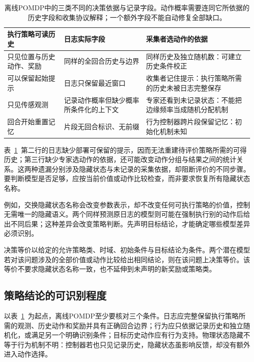 \begin{table}[htbp]
  \centering
  \small
  \begin{tabularx}{\linewidth}{XXX}
    \toprule
    执行策略可读历史 & 日志实际字段 & 采集者选动作的依据 \\
    \midrule
    只见位置与历史动作、奖励 & 同样的全回合历史与边界 & 同样历史及独立随机数：可建立历史条件校正 \\
    可以保留起始提示 & 日志只保留最近窗口 & 收集者记住提示：执行策略所需的历史未被日志完整保存 \\
    只见传感观测 & 记录动作概率但缺少概率所条件化的上下文 & 专家还看到未记录状态：不能把边缘频率当成随机分配机制 \\
    回合开始重置记忆 & 片段无回合标识、无前缀 & 行为控制器跨片段保留记忆：初始化机制未知 \\
    \bottomrule
  \end{tabularx}
  \caption{离线POMDP中的三类不同的决策依据与记录字段。动作概率需要连同它所依据的历史字段和收集协议解释；一个额外字段不能自动修复全部缺口。}
  \label{tab:rl-information-information-sets}
\end{table}

表~\ref{tab:rl-information-information-sets}~第二行的日志缺少部署可保留的提示，因而无法重建待评价策略所需的可得历史；第三行缺少专家选动作的依据，还可能改变动作分组与结果之间的统计关系。这两种遗漏分别涉及隐藏状态与未记录的采集依据，却阻断评价的不同步骤。要判断模型是否足够，应按当前价值或动作比较检查，而非要求恢复所有隐藏状态名称。

例如，交换隐藏状态名称会改变参数表示，却不改变任何可执行策略的价值，控制无需唯一的隐藏语义。两个同样预测原日志的模型则可能在强制执行别的动作后给出不同后果；这种差异会改变策略判断。先声明目标结论，才能确定哪些模型差异必须识别。

\begin{definition}[给定问题上的决策等价]
  \label{def:rl-information-decision-equivalence}
  决策等价以给定的允许策略类、时域、初始条件与目标结论为条件。两个潜在模型若对该问题涉及的全部价值或动作比较给出相同结论，则在该问题上决策等价。该等价不要求隐藏状态名称一致，也不延伸到未声明的新奖励或策略类。
\end{definition}

\subsection{策略结论的可识别程度}
\label{sec:rl-information-identification-levels}

以表~\ref{tab:rl-information-information-sets}~为起点，离线POMDP至少要核对三个条件。日志应完整保留执行策略所需的观测、历史动作和奖励并具有正确回合边界；行为应只依据记录历史和独立随机化，或满足另一个明确识别条件；目标历史动作应有行为支持。物理状态隐藏不等于行为机制不明：控制器若也只见记录历史，隐藏状态虽影响反馈，却没有额外进入动作选择。


